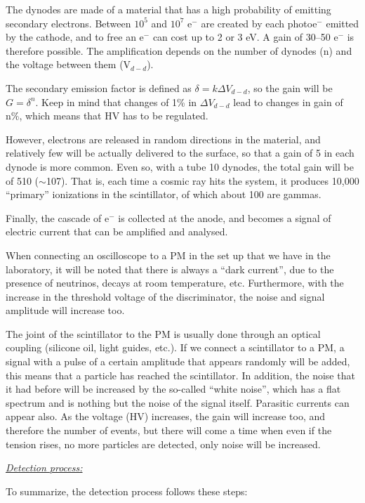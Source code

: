 The dynodes are made ​​of a material that has a high probability of emitting secondary electrons. Between $10^5$ and $10^7$ e$^-$ are created by each photoe$^-$ emitted by the cathode, and to free an e$^-$ can cost up to 2 or 3 eV. A gain of 30--50 e$^-$ is therefore possible. The amplification depends on the number of dynodes (n) and the voltage between them (V$_{d-d}$).
 
The secondary emission factor is defined as $\delta = k\Delta V_{d-d}$, so the gain will be $G = \delta^n$. Keep in mind that changes of 1\% in $\Delta V_{d-d}$ lead to changes in gain of n\%, which means that HV has to be regulated.

		However, electrons are released in random directions in the material, and relatively few will be actually delivered to the surface, so that a gain of 5 in each dynode is more common. Even so, with a tube 10 dynodes, the total gain will be of 510 ($\sim$107). That is, each time a cosmic ray hits the system, it produces 10,000 \enquote{primary} ionizations in the scintillator, of which about 100 are gammas.

Finally, the cascade of e$^-$ is collected at the anode, and becomes a signal of electric current that can be amplified and analysed.
	   
		When connecting an oscilloscope to a PM in the set up that we have in the laboratory, it will be noted that there is always a \enquote{dark current}, due to the presence of neutrinos, decays at room temperature, etc. Furthermore, with the increase in the threshold voltage of the discriminator, the noise and signal amplitude will increase too.

The joint of the scintillator to the PM is usually done through an optical coupling (silicone oil, light guides, etc.). If we connect a scintillator to a PM, a signal with a pulse of a certain amplitude that appears randomly will be added, this means that a particle has reached the scintillator. In addition, the noise that it had before will be increased by the so-called \enquote{white noise}, which has a flat spectrum and is nothing but the noise of the signal itself. Parasitic currents can appear also. As the voltage (HV) increases, the gain will increase too, and therefore the number of events, but there will come a time when even if the tension rises, no more particles are detected, only noise will be increased.

	\noindent\underline{\textit{Detection process:}}

To summarize, the detection process follows these steps:

